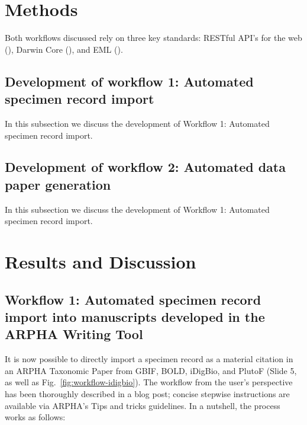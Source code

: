 \section{Methods}

Both workflows discussed  rely on three key standards: RESTful API's for the web (\cite{kurtz_what_2013}), Darwin Core (\cite{wieczorek_darwin_2012}), and EML (\cite{fegraus_maximizing_2005}).

\subsection{Development of workflow 1: Automated specimen record import}

In this subsection we discuss the development of Workflow 1: Automated specimen record import.

\subsection{Development of workflow 2: Automated data paper generation}

In this subsection we discuss the development of Workflow 1: Automated specimen record import.

\section{Results and Discussion}

\subsection{Workflow 1: Automated specimen record import into manuscripts developed in the ARPHA Writing Tool}

It is now possible to directly import a specimen record as a material citation in an ARPHA Taxonomic Paper from GBIF, BOLD, iDigBio, and PlutoF (Slide 5, as well as Fig.~\ref{fig:workflow-idigbio}). The workflow from the user's perspective has been thoroughly described in a blog post; concise stepwise instructions are available via ARPHA's Tips and tricks guidelines. In a nutshell, the process works as follows:

